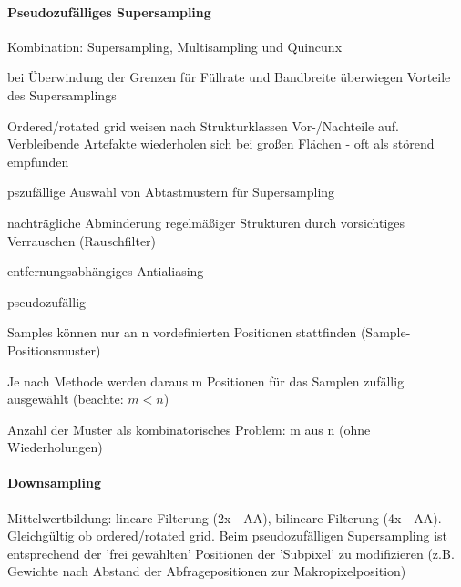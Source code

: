 \documentclass[landscape]{article}
\begin{document}
\begin{multicols}{3}
  \paragraph{Pseudozufälliges Supersampling}
  \begin{itemize*}
    \item Kombination: Supersampling, Multisampling und Quincunx
    \item bei Überwindung der Grenzen für Füllrate und Bandbreite überwiegen Vorteile des Supersamplings
    \item Ordered/rotated grid weisen nach Strukturklassen Vor-/Nachteile auf. Verbleibende Artefakte wiederholen sich bei großen Flächen - oft als störend empfunden
    \item pszufällige Auswahl von Abtastmustern für Supersampling
    \item nachträgliche Abminderung regelmäßiger Strukturen durch vorsichtiges Verrauschen (Rauschfilter)
    \item entfernungsabhängiges Antialiasing
    \item pseudozufällig
    \begin{itemize*}
      \item Samples können nur an n vordefinierten Positionen stattfinden (Sample-Positionsmuster)
      \item Je nach Methode werden daraus m Positionen für das Samplen zufällig ausgewählt (beachte: $m < n$)
      \item Anzahl der Muster als kombinatorisches Problem: m aus n (ohne Wiederholungen)
    \end{itemize*}
  \end{itemize*}
  
  \paragraph{Downsampling}
  Mittelwertbildung: lineare Filterung (2x - AA), bilineare Filterung (4x - AA). Gleichgültig ob ordered/rotated grid. 
  Beim pseudozufälligen Supersampling ist entsprechend der 'frei gewählten' Positionen der 'Subpixel' zu modifizieren (z.B. Gewichte nach Abstand der Abfragepositionen zur Makropixelposition)
  

\end{multicols}
\end{document}
